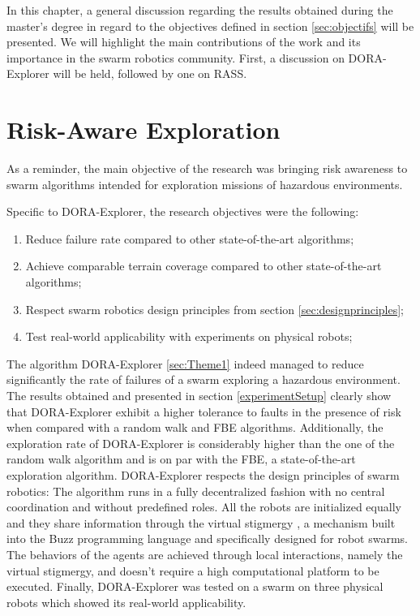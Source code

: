 \label{sec:discussion}
In this chapter, a general discussion regarding the results obtained during the master's degree in regard to the objectives defined in section \ref{sec:objectifs} will be presented. We will highlight the main contributions of the work and its importance in the swarm robotics community. First, a discussion on DORA-Explorer will be held, followed by one on RASS. 

\section{Risk-Aware Exploration}
As a reminder, the main objective of the research was bringing risk awareness to swarm algorithms intended for exploration missions of hazardous environments.

Specific to DORA-Explorer, the research objectives were the following:

\begin{enumerate}
    \item Reduce failure rate compared to other state-of-the-art algorithms;
    \item Achieve comparable terrain coverage compared to other state-of-the-art algorithms;
    \item Respect swarm robotics design principles from section \ref{sec:designprinciples};
    \item Test real-world applicability with experiments on physical robots;
\end{enumerate}

The algorithm DORA-Explorer \ref{sec:Theme1} indeed managed to reduce significantly the rate of failures of a swarm exploring a hazardous environment. The results obtained and presented in section \ref{experimentSetup} clearly show that DORA-Explorer exhibit a higher tolerance to faults in the presence of risk when compared with a random walk and FBE algorithms. Additionally, the exploration rate of DORA-Explorer is considerably higher than the one of the random walk algorithm and is on par with the FBE, a state-of-the-art exploration algorithm. DORA-Explorer respects the design principles of swarm robotics: The algorithm runs in a fully decentralized fashion with no central coordination and without predefined roles. All the robots are initialized equally and they share information through the virtual stigmergy \cite{pinciroliTuple2016}, a mechanism built into the Buzz programming language \cite{pinciroliBuzz2016} and specifically designed for robot swarms. The behaviors of the agents are achieved through local interactions, namely the virtual stigmergy, and doesn't require a high computational platform to be executed. Finally, DORA-Explorer was tested on a swarm on three physical robots which showed its real-world applicability. 

